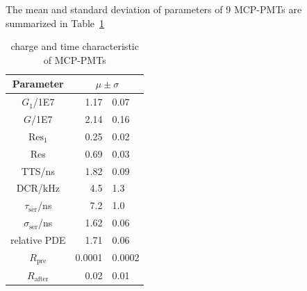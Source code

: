 The mean and standard deviation of parameters of 9 MCP-PMTs are summarized in Table~\ref{tab:summary}
\begin{table}
    \centering
    \caption{charge and time characteristic of MCP-PMTs}
    \label{tab:summary}
    \begin{tabular}{c| r @{$\pm$} l}
        Parameter&\multicolumn{2}{c}{$\mu\pm\sigma$}\\
        \hline
        $G_1$/1E7&1.17&0.07\\
        $G$/1E7&2.14&0.16\\
        $\mathrm{Res}_1$&0.25&0.02\\
        Res&0.69&0.03\\
        TTS/ns&1.82&0.09\\
        DCR/kHz&4.5&1.3\\
        $\tau_{\mathrm{ser}}$/ns&7.2&1.0\\
        $\sigma_{\mathrm{ser}}$/ns&1.62&0.06\\
        relative PDE&1.71&0.06\\
        $R_{\mathrm{pre}}$&0.0001&0.0002\\
        $R_{\mathrm{after}}$&0.02&0.01\\
        \hline
    \end{tabular}
\end{table}